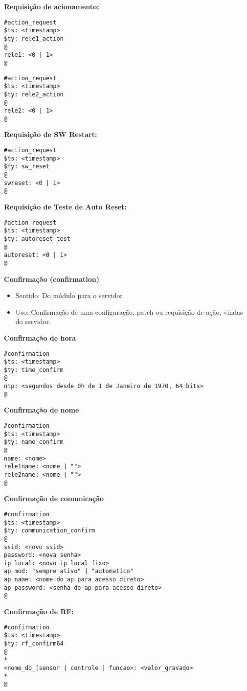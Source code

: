 \textbf{Requisição de acionamento:}
\begin{lstlisting}
#action_request
$ts: <timestamp>
$ty: rele1_action
@
rele1: <0 | 1>
@
\end{lstlisting}

\begin{lstlisting}
#action_request
$ts: <timestamp>
$ty: rele2_action
@
rele2: <0 | 1>
@
\end{lstlisting}

\textbf{Requisição de SW Restart:}
\begin{lstlisting}
#action_request
$ts: <timestamp>
$ty: sw_reset
@
swreset: <0 | 1> 
@
\end{lstlisting}

\textbf{Requisição de Teste de Auto Reset:}
\begin{lstlisting}
#action request
$ts: <timestamp>
$ty: autoreset_test
@
autoreset: <0 | 1>
@
\end{lstlisting}

\textbf{Confirmação (confirmation)}
\begin{itemize}
\item Sentido: Do módulo para o servidor
\item Uso: Confirmação de uma configuração, patch ou requisição de ação, vindas do servidor.
\end{itemize}

\textbf{Confirmação de hora}
\begin{lstlisting}
#confirmation
$ts: <timestamp>
$ty: time_confirm
@
ntp: <segundos desde 0h de 1 de Janeiro de 1970, 64 bits>
@
\end{lstlisting}

\textbf{Confirmação de nome}
\begin{lstlisting}
#confirmation
$ts: <timestamp>
$ty: name_confirm
@
name: <nome>
rele1name: <nome | "">
rele2name: <nome | "">
@
\end{lstlisting}

\textbf{Confirmação de comunicação}
\begin{lstlisting}
#confirmation
$ts: <timestamp>
$ty: communication_confirm
@
ssid: <novo ssid>
password: <nova senha>
ip local: <novo ip local fixo>
ap mod: "sempre ativo" | "automatico"
ap name: <nome do ap para acesso direto>
ap password: <senha do ap para acesso direto>
@
\end{lstlisting}

\textbf{Confirmação de RF:}
\begin{lstlisting}
#confirmation
$ts: <timestamp>
$ty: rf_confirm64
@
*
<nome_do_[sensor | controle | funcao>: <valor_gravado>
*
@
\end{lstlisting}

